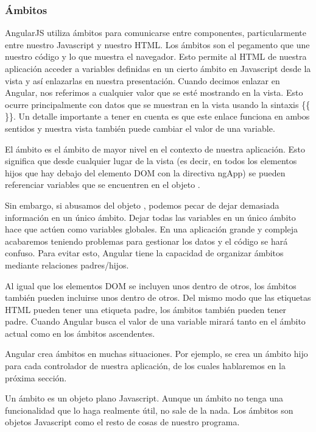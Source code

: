 \subsubsection{Ámbitos}
AngularJS utiliza ámbitos para comunicarse entre componentes, particularmente entre nuestro Javascript y nuestro HTML. Los ámbitos son el pegamento que une nuestro código y lo que muestra el navegador. Esto permite al HTML de nuestra aplicación acceder a variables definidas en un cierto ámbito en Javascript desde la vista y así enlazarlas en nuestra presentación. Cuando decimos enlazar en Angular, nos referimos a cualquier valor que se esté mostrando en la vista. Esto ocurre principalmente con datos que se muestran en la vista usando la sintaxis \{\{ \}\}.
Un detalle importante a tener en cuenta es que este enlace funciona en ambos sentidos y nuestra vista también puede cambiar el valor de una variable.

El ámbito   es el ámbito de mayor nivel en el contexto de nuestra aplicación. Esto significa que desde cualquier lugar de la vista (es decir, en todos los elementos hijos que hay debajo del elemento DOM con la directiva ngApp) se pueden referenciar variables que se encuentren en el objeto .

Sin embargo, si abusamos del objeto , podemos pecar de dejar demasiada información en un único ámbito. Dejar todas las variables en un único ámbito hace que actúen como variables globales. En una aplicación grande y compleja acabaremos teniendo problemas para gestionar los datos y el código se hará confuso. Para evitar esto, Angular tiene la capacidad de organizar ámbitos mediante relaciones padres/hijos.

Al igual que los elementos DOM se incluyen unos dentro de otros, los ámbitos también pueden incluirse unos dentro de otros. Del mismo modo que las etiquetas HTML pueden tener una etiqueta padre, los ámbitos también pueden tener padre. Cuando Angular busca el valor de una variable mirará tanto en el ámbito actual como en los ámbitos ascendentes.

Angular crea ámbitos en muchas situaciones. Por ejemplo, se crea un ámbito hijo para cada controlador de nuestra aplicación, de los cuales hablaremos en la próxima sección.

Un ámbito es un objeto plano Javascript. Aunque un ámbito no tenga una funcionalidad que lo haga realmente útil, no sale de la nada. Los ámbitos son objetos Javascript como el resto de cosas de nuestro programa.


